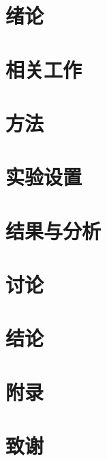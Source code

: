 \documentclass[UTF8,zihao=-4]{ctexbook}
\begin{document}
\tableofcontents

\chapter{绪论}\label{chap:intro}

\chapter{相关工作}\label{chap:related}


\chapter{方法}\label{chap:method}
\label{chap:ch3_method}


\chapter{实验设置}\label{chap:experiments}
\label{chap:theory}
\label{chap:ch4_theory}


\chapter{结果与分析}\label{chap:results}
\label{chap:ch5_algorithm}


\chapter{讨论}\label{chap:discussion}


\chapter{结论}\label{chap:conclusion}


\chapter{附录}\label{chap:appendix}


\chapter{致谢}\label{chap:ack}


\printbibliography[heading=bibintoc,title={参考文献}]
\end{document}
